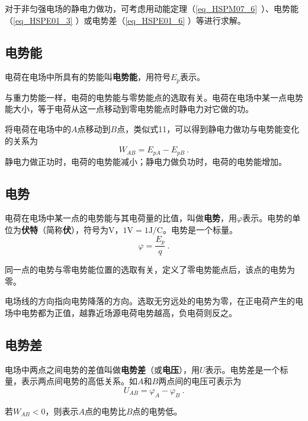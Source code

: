 对于非匀强电场的静电力做功，可考虑用动能定理（\autoref{eq_HSPM07_6}~）、电势能（\autoref{eq_HSPE01_3} ）或电势差（\autoref{eq_HSPE01_6} ）等进行求解。

\subsection{电势能}

电荷在电场中所具有的势能叫\textbf{电势能}，用符号$E_p$表示。

与重力势能一样，电荷的电势能与零势能点的选取有关。电荷在电场中某一点电势能大小，等于电荷从这一点移动到零电势能点时静电力对它做的功。

将电荷在电场中的$A$点移动到$B$点，类似式11，可以得到静电力做功与电势能变化的关系为
\begin{equation}\label{eq_HSPE01_3}
W_{AB}=E_{pA}-E_{pB}~.
\end{equation}
静电力做正功时，电荷的电势能减小；静电力做负功时，电荷的电势能增加。

\subsection{电势}

电荷在电场中某一点的电势能与其电荷量的比值，叫做\textbf{电势}，用$\varphi$表示。电势的单位为\textbf{伏特}（简称\textbf{伏}），符号为$\mathrm{V}$，$1\mathrm{V}=1\mathrm{J/C}$。电势是一个标量。
\begin{equation}\label{eq_HSPE01_7}
\varphi = \frac{E_p}{q}~.
\end{equation}

同一点的电势与零电势能位置的选取有关，定义了零电势能点后，该点的电势为零。

电场线的方向指向电势降落的方向。选取无穷远处的电势为零，在正电荷产生的电场中电势都为正值，越靠近场源电荷电势越高，负电荷则反之。

\subsection{电势差}

电场中两点之间电势的差值叫做\textbf{电势差}（或\textbf{电压}），用$U$表示。电势差是一个标量，表示两点间电势的高低关系。如$A$和$B$两点间的电压可表示为
\begin{equation}\label{eq_HSPE01_4}
U_{AB}=\varphi_A - \varphi_B~.
\end{equation}

若$W_{AB} < 0$，则表示$A$点的电势比$B$点的电势低。

